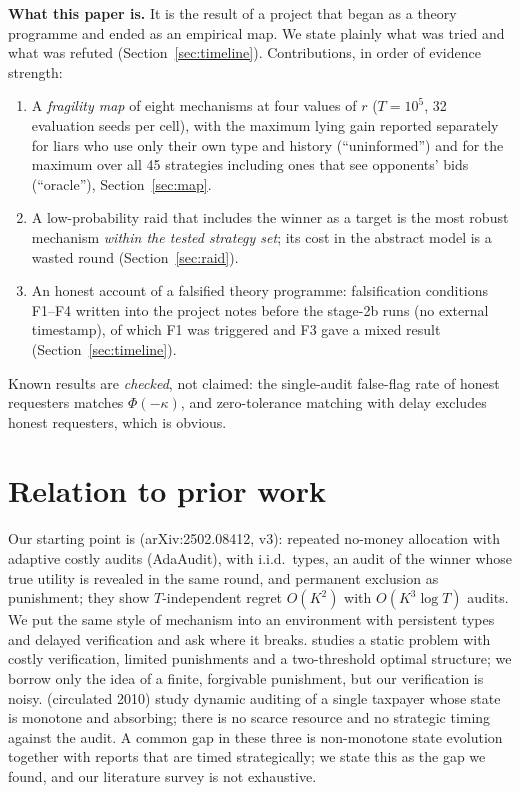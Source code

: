 \documentclass[10pt]{article}
\begin{document}
\textbf{What this paper is.} It is the result of a project that began as a theory programme and ended as an empirical map. We state plainly what was tried and what was refuted (Section~\ref{sec:timeline}). Contributions, in order of evidence strength:
\begin{enumerate}
\item A \emph{fragility map} of eight mechanisms at four values of $r$ ($T=10^5$, 32 evaluation seeds per cell), with the maximum lying gain reported separately for liars who use only their own type and history (``uninformed'') and for the maximum over all 45 strategies including ones that see opponents' bids (``oracle''), Section~\ref{sec:map}.
\item A low-probability raid that includes the winner as a target is the most robust mechanism \emph{within the tested strategy set}; its cost in the abstract model is a wasted round (Section~\ref{sec:raid}).
\item An honest account of a falsified theory programme: falsification conditions F1--F4 written into the project notes before the stage-2b runs (no external timestamp), of which F1 was triggered and F3 gave a mixed result (Section~\ref{sec:timeline}).
\end{enumerate}
Known results are \emph{checked}, not claimed: the single-audit false-flag rate of honest requesters matches $\Phi(-\kappa)$, and zero-tolerance matching with delay excludes honest requesters, which is obvious.

\section{Relation to prior work}\label{sec:related}
Our starting point is \citet{dai2025} (arXiv:2502.08412, v3): repeated no-money allocation with adaptive costly audits (AdaAudit), with i.i.d.\ types, an audit of the winner whose true utility is revealed in the same round, and permanent exclusion as punishment; they show $T$-independent regret $O(K^2)$ with $O(K^3\log T)$ audits. We put the same style of mechanism into an environment with persistent types and delayed verification and ask where it breaks. \citet{li2020} studies a static problem with costly verification, limited punishments and a two-threshold optimal structure; we borrow only the idea of a finite, forgivable punishment, but our verification is noisy. \citet{ravikumar2012} (circulated 2010) study dynamic auditing of a single taxpayer whose state is monotone and absorbing; there is no scarce resource and no strategic timing against the audit. A common gap in these three is non-monotone state evolution together with reports that are timed strategically; we state this as the gap we found, and our literature survey is not exhaustive.
\end{document}
